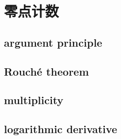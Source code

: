 \section{零点计数}
\label{b3:sec:0304}


\subsection{argument principle}
\label{b3:subsec:030401}

\subsection{Rouché theorem}
\label{b3:subsec:030402}

\subsection{multiplicity}
\label{b3:subsec:030403}

\subsection{logarithmic derivative}
\label{b3:subsec:030404}


